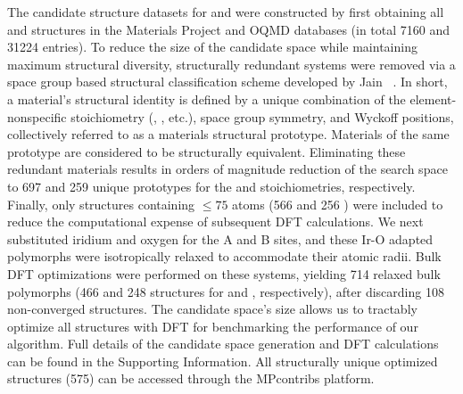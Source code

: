 %
%
%
The candidate structure datasets for \IrOtwo and \IrOthree were constructed by first obtaining all \ABtwo and \ABthree structures in the Materials Project\cite{Jain2013} and OQMD\cite{Kirklin2015} databases
(in total \num{7160} \ABtwo and \num{31224} \ABthree entries).
%
To reduce the size of the candidate space while maintaining maximum structural diversity, structurally redundant systems were removed via a space group based structural classification scheme developed by Jain ~\cite{Jain2018}.
%
In short, a material's structural identity is defined by a unique combination of the element-nonspecific stoichiometry (\ABtwo, \ABthree, etc.), space group symmetry, and Wyckoff positions, collectively referred to as a materials structural prototype.
%
Materials of the same prototype are considered to be structurally equivalent.
%
%
Eliminating these redundant materials results in orders of magnitude reduction of the search space to \num{697} and \num{259} unique prototypes for the \ABtwo and \ABthree stoichiometries, respectively.
%
%
Finally, only structures containing $\leq\num{75}$ atoms
(\num{566} \ABtwo and \num{256} \ABthree)
were included to reduce the computational expense of subsequent DFT calculations.
%
We next substituted iridium and oxygen for the A and B sites, and these Ir-O adapted polymorphs were isotropically relaxed to accommodate their atomic radii.
%
Bulk DFT optimizations were performed on these systems,
yielding \num{714} relaxed bulk \IrOx polymorphs
(\num{466} and \num{248} structures for \IrOtwo and \IrOthree, respectively),
after discarding \num{108} non-converged structures.
%
The candidate space's size allows us to tractably optimize all structures with DFT for benchmarking the performance of our algorithm.
%
Full details of the candidate space generation and DFT calculations can be found in the Supporting Information.
%
All structurally unique \IrOx optimized structures (\num{575}) can be accessed through the MPcontribs platform.~\cite{upload_MPContribs}


